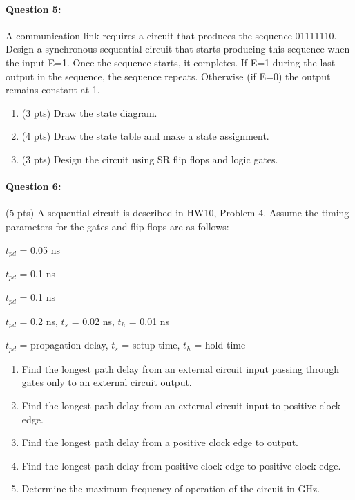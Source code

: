 \documentclass[12pt,letterpaper,titlepage]{report}
\begin{document}
\begin{raggedright}
\paragraph{Question 5:}
A communication link requires a circuit that produces the sequence 01111110. Design a synchronous sequential circuit that starts producing this sequence when the input E=1. Once the sequence starts, it completes. If E=1 during the last output in the sequence, the sequence repeats. Otherwise (if E=0) the output remains constant at 1.

\begin{enumerate} [noitemsep, label=\alph*)]
\item (3 pts) Draw the state diagram.
\item (4 pts) Draw the state table and make a state assignment.
\item (3 pts) Design the circuit using SR flip flops and logic gates.
\end{enumerate}

\paragraph{Question 6:}
(5 pts) A sequential circuit is described in HW10, Problem 4. Assume the timing parameters for the gates and flip flops are as follows:

\begin{description}[noitemsep]
\item[Inverter:] $t_{pd}$ = 0.05 ns
\item[AND gate:] $t_{pd}$ = 0.1 ns
\item[OR gate:] $t_{pd}$ = 0.1 ns
\item[Flip flop:] $t_{pd}$ = 0.2 ns, $t_{s}$ = 0.02 ns, $t_{h}$ = 0.01 ns
\item[Note:] $t_{pd}$ = propagation delay, $t_{s}$ = setup time, $t_{h}$ = hold time
\end{description}

\begin{enumerate} [noitemsep, label=\alph*)]
\item Find the longest path delay from an external circuit input passing through gates only to an external circuit output.
\item Find the longest path delay from an external circuit input to positive clock edge.
\item Find the longest path delay from a positive clock edge to output.
\item Find the longest path delay from positive clock edge to positive clock edge.
\item Determine the maximum frequency of operation of the circuit in GHz.
\end{enumerate}


\end{raggedright}
\end{document}
